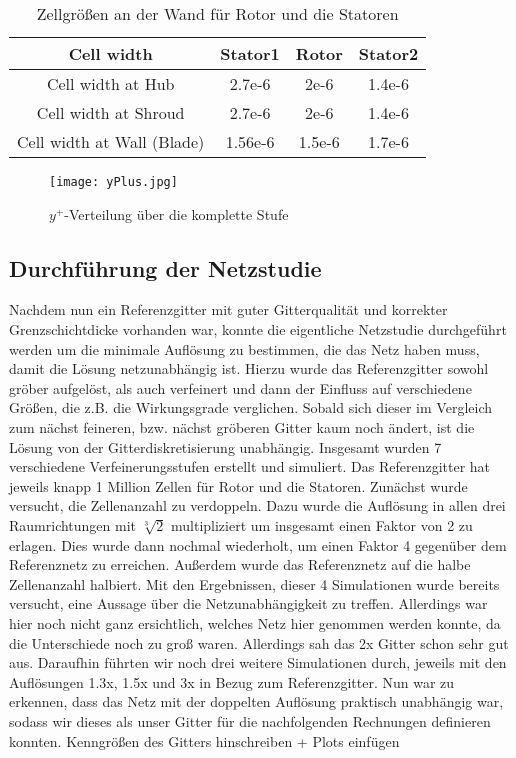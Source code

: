 \begin{table}[t]
\centering
\begin{tabular}[t]{cccc}
\toprule
 Cell width  & Stator1 & Rotor & Stator2  \\
\midrule
Cell width at Hub & 2.7e-6 & 2e-6 & 1.4e-6\\
Cell width at Shroud & 2.7e-6 & 2e-6 & 1.4e-6 \\
Cell width at Wall (Blade) & 1.56e-6 & 1.5e-6 & 1.7e-6 \\
\bottomrule
\end{tabular}
\caption{Zellgrößen an der Wand für Rotor und die Statoren}
\label{cellWidths}
\end{table}

\begin{figure}[htbp]
	\centering
	\label{imgYplusWerte}
	\texttt{[image: yPlus.jpg]}
	\caption{$y^+$-Verteilung über die komplette Stufe}
\end{figure}

\subsection{Durchführung der Netzstudie}

Nachdem nun ein Referenzgitter mit guter Gitterqualität und korrekter Grenzschichtdicke vorhanden war, konnte die eigentliche Netzstudie durchgeführt werden um die minimale Auflösung zu bestimmen, die das Netz haben muss, damit die Lösung netzunabhängig ist. Hierzu wurde das Referenzgitter sowohl gröber aufgelöst, als auch verfeinert und dann der Einfluss auf verschiedene Größen, die z.B. die Wirkungsgrade verglichen. Sobald sich dieser im Vergleich zum nächst feineren, bzw. nächst gröberen Gitter kaum noch ändert, ist die Lösung von der Gitterdiskretisierung unabhängig. 
Insgesamt wurden 7 verschiedene Verfeinerungsstufen erstellt und simuliert. Das Referenzgitter hat jeweils knapp 1 Million Zellen für Rotor und die Statoren. Zunächst wurde versucht, die Zellenanzahl zu verdoppeln. Dazu wurde die Auflösung in allen drei Raumrichtungen mit $\sqrt[3]{2}$ multipliziert um insgesamt einen Faktor von 2 zu erlagen. Dies wurde dann nochmal wiederholt, um einen Faktor 4 gegenüber dem Referenznetz zu erreichen. Außerdem wurde das Referenznetz auf die halbe Zellenanzahl halbiert. Mit den Ergebnissen, dieser 4 Simulationen wurde bereits versucht, eine Aussage über die Netzunabhängigkeit zu treffen. Allerdings war hier noch nicht ganz ersichtlich, welches Netz hier genommen werden konnte, da die Unterschiede noch zu groß waren. Allerdings sah das 2x Gitter schon sehr gut aus. Daraufhin führten wir noch drei weitere Simulationen durch, jeweils mit den Auflösungen 1.3x, 1.5x und 3x in Bezug zum Referenzgitter. Nun war zu erkennen, dass das Netz mit der doppelten Auflösung praktisch unabhängig war, sodass wir dieses als unser Gitter für die nachfolgenden Rechnungen definieren konnten. 
\todo Kenngrößen des Gitters hinschreiben + Plots einfügen


